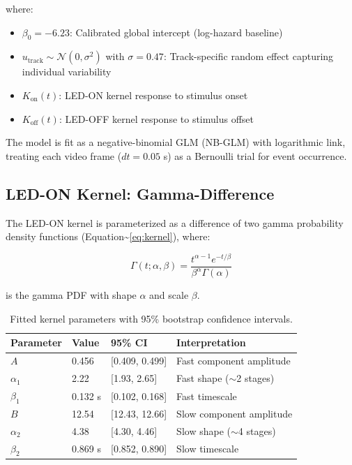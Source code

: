 \documentclass[
  11pt,
  letterpaper,
]{article}
\begin{document}
\noindent where:

\begin{itemize}
    \item $\beta_0 = -6.23$: Calibrated global intercept (log-hazard baseline)
    \item $u_{\text{track}} \sim \mathcal{N}(0, \sigma^2)$ with $\sigma = 0.47$: Track-specific random effect capturing individual variability
    \item $K_{\text{on}}(t)$: LED-ON kernel response to stimulus onset
    \item $K_{\text{off}}(t)$: LED-OFF kernel response to stimulus offset
\end{itemize}

The model is fit as a negative-binomial GLM (NB-GLM) with logarithmic
link, treating each video frame (\(dt = 0.05\) s) as a Bernoulli trial
for event occurrence.

\subsection{LED-ON Kernel: Gamma-Difference}

The LED-ON kernel is parameterized as a difference of two gamma
probability density functions
(Equation\textasciitilde{}\ref{eq:kernel}), where:

\begin{equation}
\Gamma(t; \alpha, \beta) = \frac{t^{\alpha-1} e^{-t/\beta}}{\beta^\alpha \Gamma(\alpha)}
\end{equation}

\noindent is the gamma PDF with shape \(\alpha\) and scale \(\beta\).

\begin{table}[h]
\centering
\caption{Fitted kernel parameters with 95\% bootstrap confidence intervals.}
\label{tab:params}
\begin{tabular}{llll}
\hline
\textbf{Parameter} & \textbf{Value} & \textbf{95\% CI} & \textbf{Interpretation} \\
\hline
$A$ & 0.456 & [0.409, 0.499] & Fast component amplitude \\
$\alpha_1$ & 2.22 & [1.93, 2.65] & Fast shape ($\sim$2 stages) \\
$\beta_1$ & 0.132 s & [0.102, 0.168] & Fast timescale \\
$B$ & 12.54 & [12.43, 12.66] & Slow component amplitude \\
$\alpha_2$ & 4.38 & [4.30, 4.46] & Slow shape ($\sim$4 stages) \\
$\beta_2$ & 0.869 s & [0.852, 0.890] & Slow timescale \\
\hline
\end{tabular}
\end{table}
\end{document}
